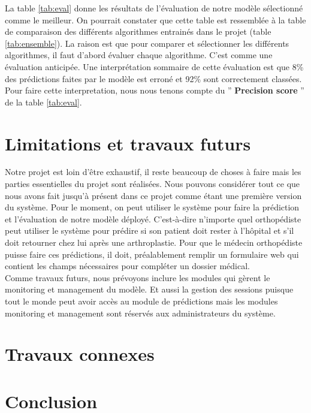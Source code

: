 \documentclass[12pt, french]{report}
\begin{document}
La table \ref{tab:eval} donne les résultats de l'évaluation de notre modèle sélectionné comme le meilleur. On pourrait constater que cette table est ressemblée à la table de comparaison des différents algorithmes entrainés dans le projet (table \ref{tab:ensemble}). La raison est que pour comparer et sélectionner les différents algorithmes, il faut d'abord évaluer chaque algorithme. C'est comme une évaluation anticipée. Une interprétation sommaire de cette évaluation est que 8\% des prédictions faites par le modèle est erroné et 92\% sont correctement classées. Pour faire cette interpretation, nous nous tenons compte du '' \textbf{Precision score} '' de la table \ref{tab:eval}. 

\newpage

\chapter{Limitations et travaux futurs}
Notre projet est loin d'être exhaustif, il reste beaucoup de choses à faire mais les parties essentielles du projet sont réalisées. Nous pouvons considérer tout ce que nous avons fait jusqu'à présent dans ce projet comme étant une première version du système. Pour le moment, on peut utiliser le système pour faire la prédiction et l'évaluation de notre modèle déployé. C'est-à-dire n'importe quel orthopédiste peut utiliser le système pour prédire si son patient doit rester à l'hôpital et s'il doit retourner chez lui après une arthroplastie. Pour que le médecin orthopédiste puisse faire ces prédictions, il doit, préalablement remplir un formulaire web qui contient les champs nécessaires pour compléter un dossier médical.   \\

Comme travaux futurs, nous prévoyons inclure les modules qui gèrent le monitoring et management du modèle. Et aussi la gestion des sessions puisque tout le monde peut avoir accès au module de prédictions mais les modules monitoring et management sont réservés aux administrateurs du système.    
\newpage

\chapter{Travaux connexes}


\newpage

\chapter{Conclusion}

\newpage
{}


 	
\end{document}
